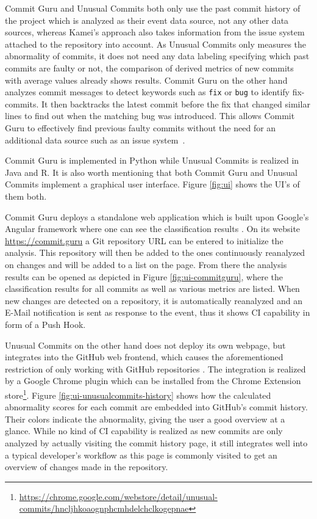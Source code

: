 Commit Guru and Unusual Commits both only use the past commit history of the project which is analyzed as their event data source, not any other data sources, whereas Kamei's approach also takes information from the issue system attached to the repository into account.
As Unusual Commits only measures the abnormality of commits, it does not need any data labeling specifying which past commits are faulty or not, the comparison of derived metrics of new commits with average values already shows results.
Commit Guru on the other hand analyzes commit messages to detect keywords such as \texttt{fix} or \texttt{bug} to identify fix-commits. It then backtracks the latest commit before the fix that changed similar lines to find out when the matching bug was introduced. 
This allows Commit Guru to effectively find previous faulty commits without the need for an additional data source such as an issue system~\cite{Rosen2015}.

Commit Guru is implemented in Python while Unusual Commits is realized in Java and R. It is also worth mentioning that both Commit Guru and Unusual Commits implement a graphical user interface. 
Figure \ref{fig:ui} shows the UI's of them both. 

Commit Guru deploys a standalone web application which is built upon Google's Angular framework where one can see the classification results \cite{Rosen2015}. On its website \url{https://commit.guru} a Git repository URL can be entered to initialize the analysis. This repository will then be added to the ones continuously reanalyzed on changes and will be added to a list on the page. From there the analysis results can be opened as depicted in Figure \ref{fig:ui-commitguru}, where the classification results for all commits as well as various metrics are listed. When new changes are detected on a repository, it is automatically reanalyzed and an E-Mail notification is sent as response to the event, thus it shows CI capability in form of a Push Hook.

Unusual Commits on the other hand does not deploy its own webpage, but integrates into the GitHub web frontend, which causes the aforementioned restriction of only working with GitHub repositories \cite{Goyal2017}. The integration is realized by a Google Chrome plugin which can be installed from the Chrome Extension store\footnote{\url{https://chrome.google.com/webstore/detail/unusual-commits/hncljhkoaognphcmhdelchclkogepnae}}. Figure \ref{fig:ui-unusualcommits-history} shows how the calculated abnormality scores for each commit are embedded into GitHub's commit history. Their colors indicate the abnormality, giving the user a good overview at a glance. While no kind of CI capability is realized as new commits are only analyzed by actually visiting the commit history page, it still integrates well into a typical developer's workflow as this page is commonly visited to get an overview of changes made in the repository. 

